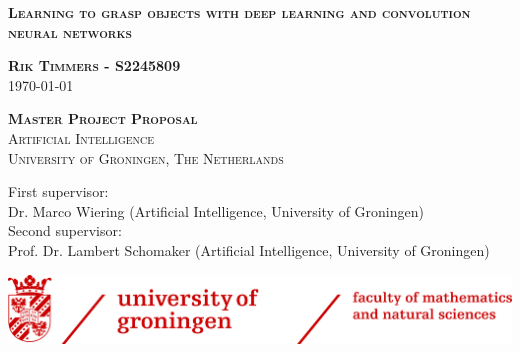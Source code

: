 \documentclass[a4paper,10pt]{article}
\begin{document}
\begin{titlepage}
  \centering
  {\scshape\LARGE \textbf{Learning to grasp objects with deep learning and convolution neural networks} \par}
  \vspace{2cm}
  {\scshape \Large \textbf{Rik Timmers - S2245809} \\ 
  \today \par}
  \vspace{2cm}
  {\scshape\Large \textbf{Master Project Proposal} \\
  Artificial Intelligence \\
  University of Groningen, The Netherlands}
  \vfill
  \begin{flushleft}
  First supervisor: \\
  Dr. Marco Wiering (Artificial Intelligence, University of Groningen) \\
  Second supervisor: \\
  Prof. Dr. Lambert Schomaker (Artificial Intelligence, University of Groningen)
  \end{flushleft}
  \includegraphics[width=\textwidth]{logo}
\end{titlepage}









\end{document}
